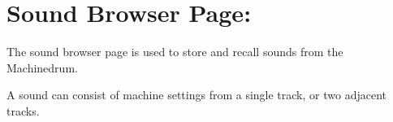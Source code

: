 \chapter{Sound Browser Page:}
The sound browser page is used to store and recall sounds from the Machinedrum.

A sound can consist of machine settings from a single track, or two adjacent tracks.